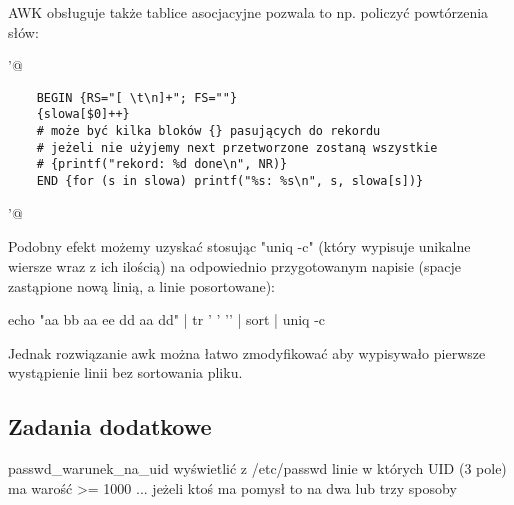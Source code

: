 \documentclass{pdfBooklets}
\begin{document}
\noindent
AWK obsługuje także tablice asocjacyjne pozwala to np. policzyć powtórzenia słów:

\begin{oframed}\noindent{}\Verb@ '@\vspace{-0.95em}
\begin{verbatim}
	BEGIN {RS="[ \t\n]+"; FS=""}
	{slowa[$0]++}
	# może być kilka bloków {} pasujących do rekordu
	# jeżeli nie użyjemy next przetworzone zostaną wszystkie
	# {printf("rekord: %d done\n", NR)}
	END {for (s in slowa) printf("%s: %s\n", s, slowa[s])}
\end{verbatim}
\vspace{-0.95em}\Verb@'@\end{oframed}

Podobny efekt możemy uzyskać stosując "uniq -c" (który wypisuje unikalne wiersze wraz z ich ilością)
na odpowiednio przygotowanym napisie (spacje zastąpione nową linią, a linie posortowane):
\begin{CodeFrame*}[bash]{}
echo "aa bb aa ee dd aa dd" | tr ' ' '\n' | sort | uniq -c
\end{CodeFrame*}
Jednak rozwiązanie awk można łatwo zmodyfikować aby wypisywało pierwsze wystąpienie linii bez sortowania pliku.

\subsection{Zadania dodatkowe}

\vspace{6pt}

\begin{Zadanie}{}{passwd_warunek_na_uid}
wyświetlić z /etc/passwd linie w których UID (3 pole) ma warość >= 1000 ... jeżeli ktoś ma pomysł to na dwa lub trzy sposoby
\end{Zadanie}


\end{document}
